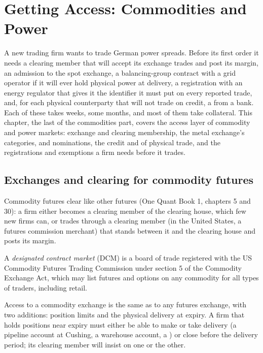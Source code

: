 \chapter{Getting Access: Commodities and Power}\label{ch:m3:getting-access-commodities-and-power}

A new trading firm wants to trade German power spreads. Before its first order it needs a
clearing member that will accept its exchange trades and post its margin, an admission to the
spot exchange, a balancing-group contract with a grid operator if it will ever hold physical
power at delivery, a registration with an energy regulator that gives it the identifier it
must put on every reported trade, and, for each physical counterparty that will not trade on
credit, a  from a bank. Each of these takes weeks, some months, and most of
them take collateral. This chapter, the last of the commodities part, covers the access layer
of commodity and power markets: exchange and clearing membership, the metal exchange's
categories,  and nominations, the credit and  of physical trade,
and the registrations and exemptions a firm needs before it trades.

\section{Exchanges and clearing for commodity futures}

Commodity futures clear like other futures (One Quant Book 1, chapters 5 and 30): a firm either
becomes a clearing member of the clearing house, which few new firms can, or trades through a
clearing member (in the United States, a futures commission merchant) that stands between it and
the clearing house and posts its margin.

\begin{definition}\label{def:m3:getting-access-commodities-and-power:dcm}
A \emph{designated contract market} (DCM) is a board of trade
registered with the US Commodity Futures Trading Commission under section 5 of the Commodity Exchange
Act, which may list futures and options on any commodity for all types of traders, including retail.
\end{definition}

Access to a commodity exchange is the same as to any futures exchange, with two additions: position
limits and the physical delivery at expiry. A firm that holds positions near expiry must either be able
to make or take delivery (a pipeline account at Cushing, a warehouse account, a ) or close
before the delivery period; its clearing member will insist on one or the other.

